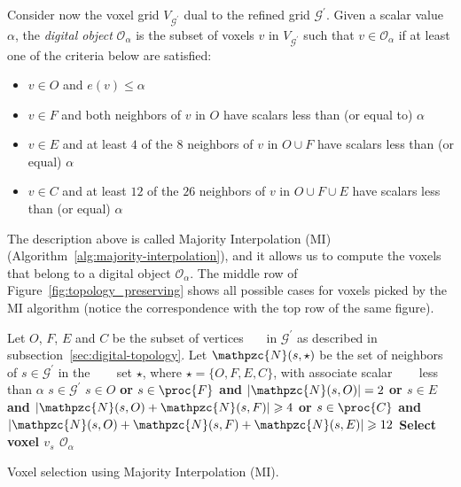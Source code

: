 Consider now the voxel grid $V_{\mathcal{G^\prime}}$ dual to the
refined grid $\mathcal{G}^\prime$.  Given a scalar value $\alpha$, the
\emph{digital object} $\mathcal{O}_\alpha$ is the subset of voxels $v$
in $V_{\mathcal{G^\prime}}$ such that $v\in\mathcal{O}_\alpha$ if at
least one of the criteria below are satisfied:
\begin{itemize}[topsep=0px,partopsep=0px,itemsep=0px,parsep=0px]
\item $v\in O$ and $e(v)\leq\alpha$
\item $v\in F$ and both neighbors of $v$ in $O$ have scalars less than
  (or equal to) $\alpha$
\item $v\in E$ and at least $4$ of the $8$ neighbors of $v$ in $O\cup
  F$ have scalars less than (or equal) $\alpha$
\item $v\in C$ and at least $12$ of the $26$ neighbors of $v$ in
  $O\cup F\cup E$ have scalars less than (or equal) $\alpha$
\end{itemize}
The description above is called Majority Interpolation (MI) 
(Algorithm~\ref{alg:majority-interpolation}), and it allows us to compute
the voxels that belong to a digital object $\mathcal{O}_\alpha$.
The middle row of Figure~\ref{fig:topology_preserving} shows all
possible cases for voxels picked by the MI algorithm (notice the
correspondence with the top row of the same figure).

\begin{algorithm}[t]
\begin{codebox}
\li \Comment Let $O$, $F$, $E$ and $C$ be the subset of vertices 
\zi ~~~in $\mathcal{G}^\prime$ as described in
subsection~\ref{sec:digital-topology}. %
\li \Comment Let $\mathpzc{N}(s, \star)$ be the set of neighbors of
$s\in\mathcal{G}^\prime$ in the \zi ~~~ set $\star$, where $\star =
\{O, F, E, C\}$, with associate scalar \zi ~~~ less than $\alpha$
\li \For $s \in \mathcal{G}^\prime$
\li     \Do  	\If $s \in O$ \bf or
\li		    $s \in \proc{F}$ and $|\mathpzc{N}(s, O)| = 2$ \bf or
\li			  $s \in E$ and $|\mathpzc{N}(s, O)+\mathpzc{N}(s, F)| 
\geqslant 4$ \bf or
\li		    $s \in \proc{C}$ and $|\mathpzc{N}(s, O)+\mathpzc{N}(s,
F)+\mathpzc{N}(s,E)| \geqslant 12$
\li		\Then Select voxel $v_s$
		\End
	\End
\li \Return $\mathcal{O}_\alpha$
\end{codebox}
\caption{Voxel selection using Majority Interpolation (MI).
}
\label{alg:majority-interpolation}
\end{algorithm}

